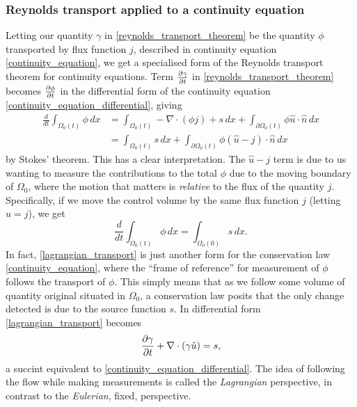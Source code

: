 \subsubsection{Reynolds transport applied to a continuity equation}
Letting our quantity $\gamma$ in \eqref{reynolds_transport_theorem} be the quantity $\phi$ transported by flux function $j$,
described in continuity equation \eqref{continuity_equation}, we get a specialised form of the Reynolds transport theorem for continuity equations.
Term $\frac{\partial \gamma}{\partial t}$ in \eqref{reynolds_transport_theorem} becomes $\frac{\partial \phi}{\partial t}$ in the differential form of the continuity equation \eqref{continuity_equation_differential}, giving
\begin{equation}\label{reynolds_transport_continuity_equation}
\begin{split}
    \frac{d}{dt}\int_{\Omega_0(t)}\phi\,dx
        &= \int_{\Omega_0(t)}-\nabla\cdot(\phi j) + s\,dx + \int_{\partial\Omega_0(t)}\phi \hat{u}\cdot\hat{n} \,dx \\
        &= \int_{\Omega_0(t)}s\,dx + \int_{\partial\Omega_0(t)}\phi (\hat{u} - j)\cdot\hat{n} \,dx
\end{split}
\end{equation}
by Stokes' theorem. This has a clear interpretation.
The $\hat{u} - j$ term is due to us wanting to measure the contributions to the total $\phi$ due to the moving boundary of
$\Omega_0$, where the motion that matters is \textit{relative} to the flux of the quantity $j$. Specifically, if we move the control volume by
the same flux function $j$ (letting $\hat{u} = j$), we get
\begin{equation}\label{lagrangian_transport}
    \frac{d}{dt}\int_{\Omega_0(t)}\phi\,dx
        = \int_{\Omega_0(0)}s\,dx.
\end{equation}
In fact, \eqref{lagrangian_transport} is just another form for the conservation law \eqref{continuity_equation},
where the ``frame of reference'' for measurement of $\phi$ follows the transport of $\phi$. This simply means that as we follow some volume of quantity
original situated in $\Omega_0$, a conservation law posits that the only change detected is due to the source function $s$. In differential form
\eqref{lagrangian_transport} becomes
\begin{equation}\label{lagrangian_transport_differential}
    \frac{\partial \gamma}{\partial t} + \nabla \cdot(\gamma \hat{u}) = s,
\end{equation}
a succint equivalent to \eqref{continuity_equation_differential}.
The idea of following the flow while making measurements is called the \textit{Lagrangian} perspective, in contrast to the \textit{Eulerian}, fixed, perspective.
